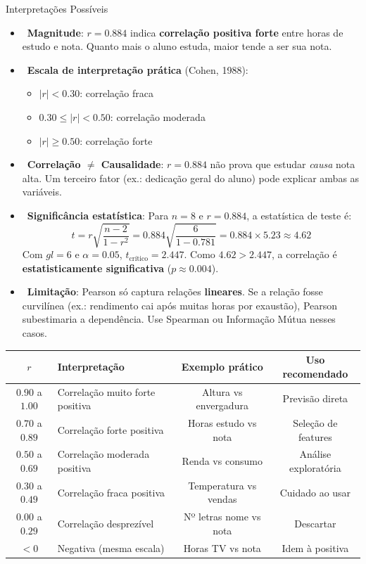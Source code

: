 \documentclass[12pt,a4paper]{article}
\begin{document}
\begin{exemplobox}{Interpretações Possíveis}
\begin{itemize}
  \item {}\ \textbf{Magnitude}: $r = 0{.}884$ indica \textbf{correlação positiva forte} entre horas de estudo e nota. Quanto mais o aluno estuda, maior tende a ser sua nota.
  \item {}\ \textbf{Escala de interpretação prática} (Cohen, 1988):
    \begin{itemize}
      \item $|r| < 0{.}30$: correlação fraca
      \item $0{.}30 \leq |r| < 0{.}50$: correlação moderada
      \item $|r| \geq 0{.}50$: correlação forte
    \end{itemize}
  \item {}\ \textbf{Correlação $\neq$ Causalidade}: $r = 0{.}884$ não prova que estudar \textit{causa} nota alta. Um terceiro fator (ex.: dedicação geral do aluno) pode explicar ambas as variáveis.
  \item {}\ \textbf{Significância estatística}: Para $n=8$ e $r=0{.}884$, a estatística de teste é:
    \[
      t = r\sqrt{\frac{n-2}{1-r^2}} = 0{.}884\sqrt{\frac{6}{1-0{.}781}} = 0{.}884 \times 5{.}23 \approx 4{.}62
    \]
    Com $gl=6$ e $\alpha=0{.}05$, $t_{\text{crítico}} = 2{.}447$. Como $4{.}62 > 2{.}447$, a correlação é \textbf{estatisticamente significativa} ($p \approx 0{.}004$).
  \item {}\ \textbf{Limitação}: Pearson só captura relações \textbf{lineares}. Se a relação fosse curvilínea (ex.: rendimento cai após muitas horas por exaustão), Pearson subestimaria a dependência. Use Spearman ou Informação Mútua nesses casos.
\end{itemize}
\end{exemplobox}

\begin{center}
\begin{tabular}{clcc}
\toprule
$r$ & Interpretação & Exemplo prático & Uso recomendado \\
\midrule
$0{.}90$ a $1{.}00$ & Correlação muito forte positiva & Altura vs envergadura & Previsão direta \\
$0{.}70$ a $0{.}89$ & Correlação forte positiva & Horas estudo vs nota & Seleção de features \\
$0{.}50$ a $0{.}69$ & Correlação moderada positiva & Renda vs consumo & Análise exploratória \\
$0{.}30$ a $0{.}49$ & Correlação fraca positiva & Temperatura vs vendas & Cuidado ao usar \\
$0{.}00$ a $0{.}29$ & Correlação desprezível & Nº letras nome vs nota & Descartar \\
$< 0$ & Negativa (mesma escala) & Horas TV vs nota & Idem à positiva \\
\bottomrule
\end{tabular}
\end{center}
\end{document}
